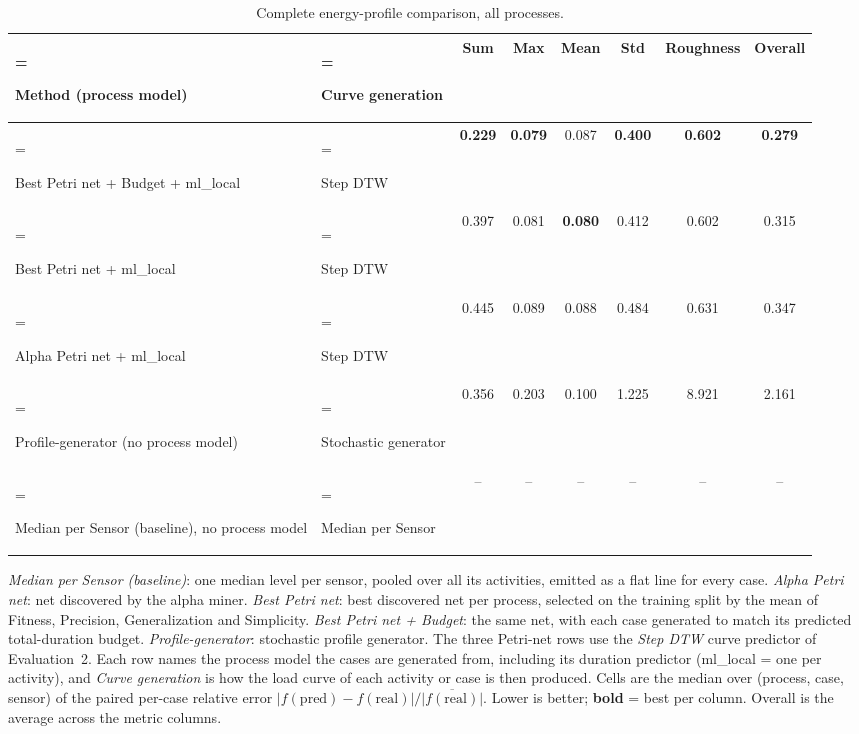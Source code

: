 \begin{table}[H]
\centering

\begin{minipage}{\textwidth}
\centering

\captionsetup{
    justification=centering,
    singlelinecheck=false,
    format=plain
}

\caption{Complete energy-profile comparison, all processes.}
\label{tab:energy_profile}

\vspace{-0.5em}

\small
\begin{tabularx}{\linewidth}{>{\hsize=1.3\hsize\linewidth=\hsize\raggedright\arraybackslash}X>{\hsize=0.7\hsize\linewidth=\hsize\raggedright\arraybackslash}Xcccccc}
\toprule
Method (process model) & Curve generation & Sum & Max & Mean & Std & Roughness & Overall \\
\midrule
Best Petri net + Budget + ml\_local & Step DTW & \textbf{0.229} & \textbf{0.079} & 0.087 & \textbf{0.400} & \textbf{0.602} & \textbf{0.279} \\
Best Petri net + ml\_local & Step DTW & 0.397 & 0.081 & \textbf{0.080} & 0.412 & 0.602 & 0.315 \\
Alpha Petri net + ml\_local & Step DTW & 0.445 & 0.089 & 0.088 & 0.484 & 0.631 & 0.347 \\
\midrule
Profile-generator (no process model) & Stochastic generator & 0.356 & 0.203 & 0.100 & 1.225 & 8.921 & 2.161 \\
\midrule
Median per Sensor (baseline), no process model & Median per Sensor & -- & -- & -- & -- & -- & -- \\
\bottomrule
\end{tabularx}

\vspace{0.5em}

\parbox{\linewidth}{%
\footnotesize
\textit{Median per Sensor (baseline)}: one median level per sensor, pooled over all its activities, emitted as a flat line for every case. \textit{Alpha Petri net}: net discovered by the alpha miner. \textit{Best Petri net}: best discovered net per process, selected on the training split by the mean of Fitness, Precision, Generalization and Simplicity. \textit{Best Petri net + Budget}: the same net, with each case generated to match its predicted total-duration budget. \textit{Profile-generator}: stochastic profile generator. The three Petri-net rows use the \textit{Step DTW} curve predictor of Evaluation~2. Each row names the process model the cases are generated from, including its duration predictor (ml\_local = one per activity), and \textit{Curve generation} is how the load curve of each activity or case is then produced. Cells are the median over (process, case, sensor) of the paired per-case relative error $|f(\mathrm{pred})-f(\mathrm{real})|/\overline{|f(\mathrm{real})|}$. Lower is better; \textbf{bold} = best per column. Overall is the average across the metric columns.
}

\end{minipage}

\end{table}
